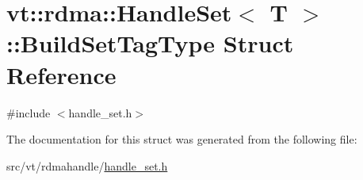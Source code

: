 \hypertarget{structvt_1_1rdma_1_1_handle_set_1_1_build_set_tag_type}{}\section{vt\+:\+:rdma\+:\+:Handle\+Set$<$ T $>$\+:\+:Build\+Set\+Tag\+Type Struct Reference}
\label{structvt_1_1rdma_1_1_handle_set_1_1_build_set_tag_type}


{\ttfamily \#include $<$handle\+\_\+set.\+h$>$}



The documentation for this struct was generated from the following file\+:\begin{DoxyCompactItemize}
\item 
src/vt/rdmahandle/\hyperlink{handle__set_8h}{handle\+\_\+set.\+h}\end{DoxyCompactItemize}

